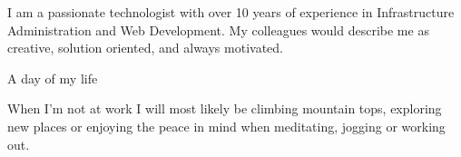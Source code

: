 




I am a passionate technologist with over 10 years of experience in
Infrastructure Administration and Web Development.
My colleagues would
describe me as
{\color{accent}creative},
{\color{accent}solution oriented},
and always {\color{accent}motivated}.


\vspace{2mm}

\begin{center}
{\small\color{body}A day of my life}
\end{center}

\vspace{4mm}

When I'm not at work I will most likely be climbing mountain tops, exploring new places or
enjoying the peace in mind when meditating, jogging or working out.



\begin{spacing}{1.8}
%
\end{spacing}


